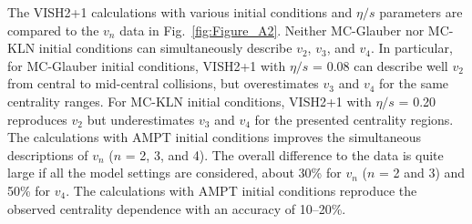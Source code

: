 The VISH2+1 calculations with various initial conditions and $\eta/s$ parameters are compared to the $v_n$ data in Fig.~\ref{fig:Figure_A2}.
Neither MC-Glauber nor MC-KLN initial conditions can simultaneously describe $v_2$, $v_3$, and $v_4$. In particular, for MC-Glauber initial conditions, VISH2+1 with $\eta/s$ = 0.08 can describe well $v_2$ from central to mid-central collisions, but overestimates $v_3$ and $v_4$ for the same centrality ranges. For MC-KLN initial conditions, VISH2+1 with $\eta/s$ = 0.20 reproduces $v_2$ but underestimates $v_3$ and $v_4$ for the presented centrality regions. The calculations with AMPT initial conditions improves the simultaneous descriptions of $v_n$ ($n$ = 2, 3, and 4). The overall difference to the data is quite large if all the model settings are considered, about 30\% for $v_n$ ($n$ = 2 and 3) and 50\% for $v_4$. The calculations with AMPT initial conditions reproduce the observed centrality dependence with an accuracy of 10--20\%.

